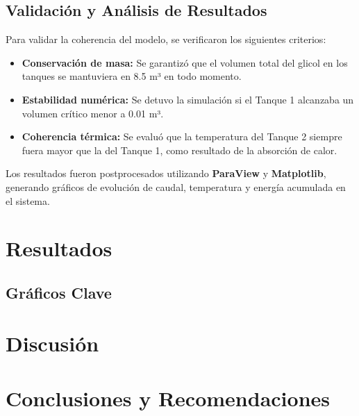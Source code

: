 \documentclass[12pt, a4paper]{article}
\begin{document}
\subsection*{Validación y Análisis de Resultados}

Para validar la coherencia del modelo, se verificaron los siguientes criterios:

\begin{itemize}
\item \textbf{Conservación de masa:} Se garantizó que el volumen total del glicol en los tanques se mantuviera en 8.5 m³ en todo momento.
\item \textbf{Estabilidad numérica:} Se detuvo la simulación si el Tanque 1 alcanzaba un volumen crítico menor a 0.01 m³.
\item \textbf{Coherencia térmica:} Se evaluó que la temperatura del Tanque 2 siempre fuera mayor que la del Tanque 1, como resultado de la absorción de calor.
\end{itemize}

Los resultados fueron postprocesados utilizando \textbf{ParaView} y \textbf{Matplotlib}, generando gráficos de evolución de caudal, temperatura y energía acumulada en el sistema.

\section{Resultados}

\subsection*{Gráficos Clave}

\section{Discusión}

\section{Conclusiones y Recomendaciones}
\end{document}
